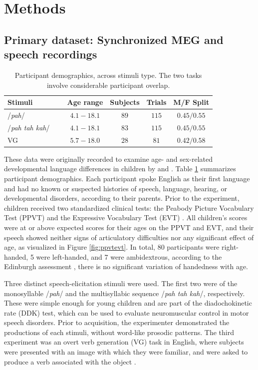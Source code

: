 \documentclass[fleqn,10pt]{wlscirep}
\begin{document}
\section*{Methods}

\subsection*{Primary dataset: Synchronized MEG and speech recordings}

\begin{table}[t]
  \centering
  \begin{tabular}{ l@{}c c c c }
    \toprule
    \textbf{Stimuli} & \textbf{Age range} & \textbf{Subjects} & \textbf{Trials}  & \textbf{M/F Split} \\
    \midrule
    /{\em pah}/~~~                    & $4.1-18.1$   &   $89$   &   $115$   &   $0.45/0.55$ \\
    /{\em pah tah kah}/~~~            & $4.1-18.1$   &   $83$   &   $115$   &   $0.45/0.55$ \\
    VG~~~                             & $5.7-18.0$   &   $28$   &   $81$    &   $0.42/0.58$  \\
    \bottomrule
  \end{tabular}
  \caption{Participant demographics, across stimuli type. The two tasks involve considerable participant overlap.}
  \label{tab:subjects}
\end{table}

These data were originally recorded to examine age- and sex-related developmental language differences in children by \cite{Doesburg2016} and \cite{Yu2014}. Table \ref{tab:subjects} summarizes participant demographics. Each participant spoke English as their first language and had no known or suspected histories of speech, language, hearing, or developmental disorders, according to their parents. Prior to the experiment, children received two standardized clinical tests: the Peabody Picture Vocabulary Test (PPVT) \cite{Dunn97} and the Expressive Vocabulary Test (EVT) \cite{EVT}. All children's scores were at or above expected scores for their ages on the PPVT and EVT, and their speech showed neither signs of articulatory difficulties nor any significant effect of age, as visualized in Figure \ref{fig:ppvtevt}. In total, 80 participants were right-handed, 5 were left-handed, and 7 were ambidextrous, according to the Edinburgh assessment \cite{Oldfield1971}, there is no significant variation of handedness with age.

Three distinct speech-elicitation stimuli were used. The first two were of the monosyllable /{\em pah}/ and the multisyllabic sequence /{\em pah tah kah}/, respectively. These were simple enough for young children and are part of the diadochokinetic rate (DDK) test, which can be used to evaluate neuromuscular control in motor speech disorders. Prior to acquisition, the experimenter demonstrated the productions of each stimuli, without word-like prosodic patterns. The third experiment was an overt verb generation (VG) task in English, where subjects were presented with an image with which they were familiar, and were asked to produce a verb associated with the object \cite{Doesburg2016}.
\end{document}
